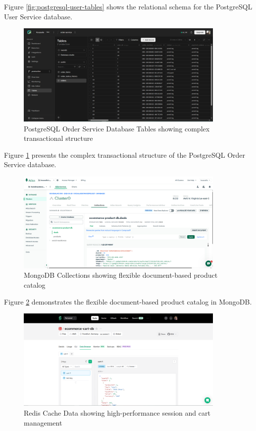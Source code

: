 Figure \ref{fig:postgresql-user-tables} shows the relational schema for the PostgreSQL User Service database.

\begin{figure}[H]
\centering
\includegraphics[width=0.9\textwidth]{figures/chapter5/postgresql-database-order-tables.png}
\caption{PostgreSQL Order Service Database Tables showing complex transactional structure}
\label{fig:postgresql-order-tables}
\end{figure}

Figure \ref{fig:postgresql-order-tables} presents the complex transactional structure of the PostgreSQL Order Service database.

\begin{figure}[H]
\centering
\includegraphics[width=0.9\textwidth]{figures/chapter5/mongodb-collections.png}
\caption{MongoDB Collections showing flexible document-based product catalog}
\label{fig:mongodb-collections}
\end{figure}

Figure \ref{fig:mongodb-collections} demonstrates the flexible document-based product catalog in MongoDB.

\begin{figure}[H]
\centering
\includegraphics[width=0.9\textwidth]{figures/chapter5/redis-cache-data.png}
\caption{Redis Cache Data showing high-performance session and cart management}
\label{fig:redis-cache-data}
\end{figure}

